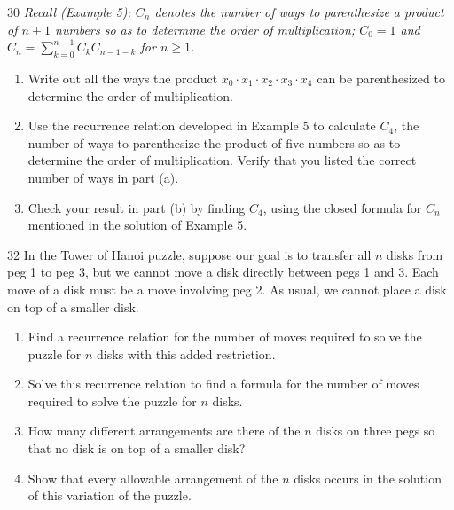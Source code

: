 \documentclass[11pt]{article}
\begin{document}
\begin{exercise}{30}
    \textit{Recall (Example 5): $C_n$ denotes the number of ways to
    parenthesize a product of $n+1$ numbers so as to determine the
    order of multiplication; $C_0 = 1$ and
    $C_n = \sum_{k=0}^{n-1} C_k C_{n-1-k}$ for $n \geq 1$.}
    \begin{enumerate}[label=(\alph*)]
        \item Write out all the ways the product
        $x_0 \cdot x_1 \cdot x_2 \cdot x_3 \cdot x_4$ can be
        parenthesized to determine the order of multiplication.
        \item Use the recurrence relation developed in Example 5 to
        calculate $C_4$, the number of ways to parenthesize the
        product of five numbers so as to determine the order of
        multiplication. Verify that you listed the correct number of
        ways in part (a).
        \item Check your result in part (b) by finding $C_4$, using
        the closed formula for $C_n$ mentioned in the solution of
        Example 5.
    \end{enumerate}
\end{exercise}

\begin{exercise}{32}
    In the Tower of Hanoi puzzle, suppose our goal is to transfer all
    $n$ disks from peg 1 to peg 3, but we cannot move a disk directly
    between pegs 1 and 3. Each move of a disk must be a move involving
    peg 2. As usual, we cannot place a disk on top of a smaller disk.
    \begin{enumerate}[label=(\alph*)]
        \item Find a recurrence relation for the number of moves
        required to solve the puzzle for $n$ disks with this added
        restriction.
        \item Solve this recurrence relation to find a formula for
        the number of moves required to solve the puzzle for $n$
        disks.
        \item How many different arrangements are there of the $n$
        disks on three pegs so that no disk is on top of a smaller
        disk?
        \item Show that every allowable arrangement of the $n$ disks
        occurs in the solution of this variation of the puzzle.
    \end{enumerate}
\end{exercise}
\end{document}
